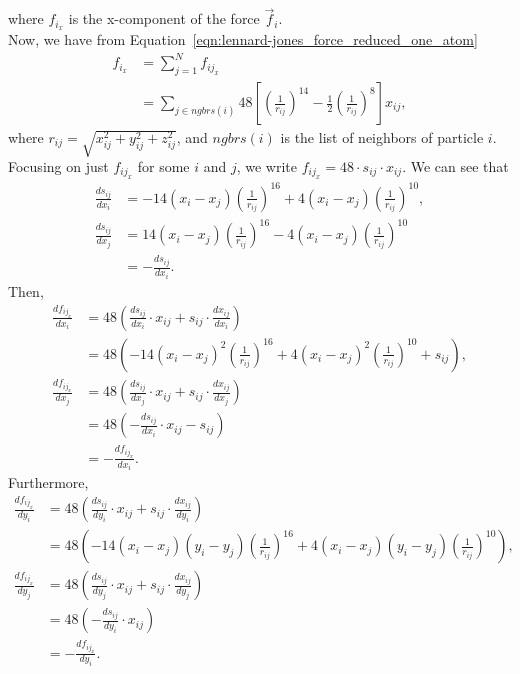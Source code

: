 \documentclass[../Main.tex]{subfiles}
\begin{document}
where $f_{i_{x}}$ is the x-component of the force $\vec{f}_{i}$. \\
Now, we have from Equation~\ref{eqn:lennard-jones_force_reduced_one_atom}
\begin{align*}
f_{i_{x}} &= \sum_{j=1}^{N} f_{ij_{x}} \\
&= \sum_{j\in ngbrs(i)} 48\left[ \left( \frac{1}{r_{ij}}\right)^{14} - \frac{1}{2}\left( \frac{1}{r_{ij}}\right)^{8} \right]x_{ij},
\end{align*} where $r_{ij} = \sqrt{x_{ij}^{2} + y_{ij}^{2} + z_{ij}^{2}}$, and $ngbrs(i)$ is the list of neighbors of particle $i$. \\
Focusing on just $f_{ij_{x}}$ for some $i$ and $j$, we write $f_{ij_{x}} = 48\cdot s_{ij} \cdot x_{ij}$. We can see that
\begin{align*}
\frac{ds_{ij}}{dx_{i}} & = -14\left(x_{i} - x_{j}\right)\left(\frac{1}{r_{ij}}\right)^{16}+ 4\left(x_{i} - x_{j}\right)\left(\frac{1}{r_{ij}}\right)^{10}, \\
\frac{ds_{ij}}{dx_{j}} & = 14\left(x_{i} - x_{j}\right)\left(\frac{1}{r_{ij}}\right)^{16} - 4\left(x_{i} - x_{j}\right)\left(\frac{1}{r_{ij}}\right)^{10} \\
& = - \frac{ds_{ij}}{dx_{i}}.
\end{align*}
Then,
\begin{align}
\frac{df_{ij_{x}}}{dx_{i}} &= 48\left(\frac{ds_{ij}}{dx_{i}}\cdot x_{ij} + s_{ij}\cdot \frac{dx_{ij}}{dx_{i}}\right) \nonumber \\
&= 48\left(-14\left(x_{i} - x_{j}\right)^{2}\left(\frac{1}{r_{ij}}\right)^{16}+ 4\left(x_{i} - x_{j}\right)^{2}\left(\frac{1}{r_{ij}}\right)^{10} +  s_{ij}\right), \label{eqn:i_point_derivate_x_i} \\
\frac{df_{ij_{x}}}{dx_{j}} &= 48\left(\frac{ds_{ij}}{dx_{j}}\cdot x_{ij} + s_{ij}\cdot \frac{dx_{ij}}{dx_{j}}\right) \nonumber \\
&= 48\left(- \frac{ds_{ij}}{dx_{i}}\cdot x_{ij} - s_{ij}\right) \nonumber \\
&= -\frac{df_{ij_{x}}}{dx_{i}}. \label{eqn:negative_j_point_derivative_x}
\end{align}
Furthermore,
\begin{align}
\frac{df_{ij_{x}}}{dy_{i}} &= 48\left(\frac{ds_{ij}}{dy_{i}}\cdot x_{ij} + s_{ij}\cdot \frac{dx_{ij}}{dy_{i}}\right) \nonumber \\
&= 48\left(-14\left(x_{i} - x_{j}\right)\left(y_{i} - y_{j}\right)\left(\frac{1}{r_{ij}}\right)^{16}+ 4\left(x_{i} - x_{j}\right)\left(y_{i} - y_{j}\right)\left(\frac{1}{r_{ij}}\right)^{10}\right), \label{eqn:i_point_derivate_y_i} \\
\frac{df_{ij_{x}}}{dy_{j}} &= 48\left(\frac{ds_{ij}}{dy_{j}}\cdot x_{ij} + s_{ij}\cdot \frac{dx_{ij}}{dy_{j}}\right) \nonumber \\
&= 48\left(-\frac{ds_{ij}}{dy_{i}}\cdot x_{ij}\right) \nonumber\\
& = -\frac{df_{ij_{x}}}{dy_{i}}. \label{eqn:negative_j_point_derivative_y}
\end{align}
\end{document}

